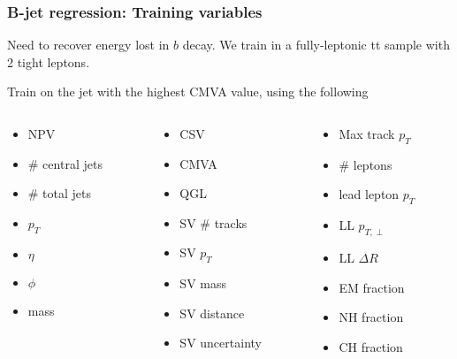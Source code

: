 \documentclass{beamer}
\begin{document}
\begin{frame}
  \frametitle{B-jet regression: Training variables}

  Need to recover energy lost in $b$ decay. We train in a fully-leptonic tt sample
  with 2 tight leptons.

  \hspace{12pt}

  Train on the jet with the highest CMVA value, using the following

  \begin{columns}
    \begin{column}{0.33\linewidth}
      \begin{itemize}
      \item NPV
      \item \# central jets
      \item \# total jets
      \item $p_T$
      \item $\eta$
      \item $\phi$
      \item mass
      \end{itemize}
    \end{column}
    \begin{column}{0.33\linewidth}
      \begin{itemize}
      \item CSV
      \item CMVA
      \item QGL
      \item SV \# tracks
      \item SV $p_T$
      \item SV mass
      \item SV distance
      \item SV uncertainty
      \end{itemize}
    \end{column}
    \begin{column}{0.33\linewidth}
      \begin{itemize}
      \item Max track $p_T$
      \item \# leptons
      \item lead lepton $p_T$
      \item LL $p_{T, \perp}$
      \item LL $\Delta R$
      \item EM fraction
      \item NH fraction
      \item CH fraction
      \end{itemize}
    \end{column}
  \end{columns}

\end{frame}
\end{document}
